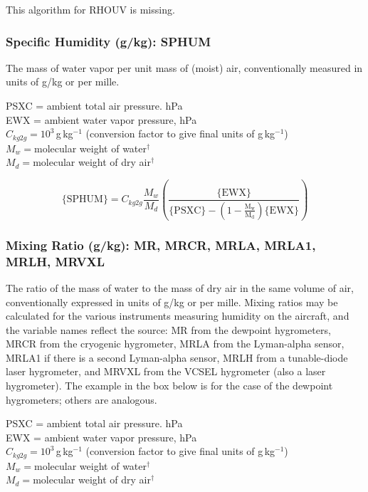 \documentclass[
  english,
]{book}
\begin{document}
This algorithm for RHOUV is missing.

\hypertarget{sphum}{%
\subsubsection*{Specific Humidity (g/kg): SPHUM}\label{sphum}}

The mass of water vapor per unit mass of (moist) air, conventionally measured in units of g/kg or per mille.

PSXC = ambient total air pressure. hPa\\
EWX = ambient water vapor pressure, hPa\\
\(C_{kg2g}=10^{3}\,\)g\(\,\)kg\(^{-1}\) (conversion factor to give
final units of g\(\,\)kg\(^{-1}\))\\
\(M_{w}=\)molecular weight of water\(^{\dagger}\)\\
\(M_{d}=\)molecular weight of dry air\(^{\dagger}\)

\begin{equation}
\mathrm{\{SPHUM\}} = C_{kg2g}\frac{M_{w}}{M_{d}}(\mathrm{\frac{\{EWX\}}{\mathrm{\{PSXC\}-(1-\frac{M_{w}}{M_{d}})\{\mathrm{EWX}\}}}})
\label{eq:SPHUM}
\end{equation}

\hypertarget{MR}{%
\subsubsection*{Mixing Ratio (g/kg): MR, MRCR, MRLA, MRLA1, MRLH, MRVXL}\label{MR}}

The ratio of the mass of water to the mass of dry air in the same volume of air, conventionally expressed in units of g/kg or per mille. Mixing ratios may be calculated for the various instruments measuring humidity on the aircraft, and the variable names reflect the source: MR from the dewpoint hygrometers, MRCR from the cryogenic hygrometer, MRLA from the Lyman-alpha sensor, MRLA1 if there is a second Lyman-alpha sensor, MRLH from a tunable-diode laser hygrometer, and MRVXL from the VCSEL hygrometer (also a laser hygrometer). The example in the box below is for the case of the dewpoint hygrometers; others are analogous.

PSXC = ambient total air pressure. hPa\\
EWX = ambient water vapor pressure, hPa\\
\(C_{kg2g}=10^{3}\,\)g\(\,\)kg\(^{-1}\) (conversion factor to give
final units of g\(\,\)kg\(^{-1}\))\\
\(M_{w}=\)molecular weight of water\(^{\dagger}\)\\
\(M_{d}=\)molecular weight of dry air\(^{\dagger}\)
\end{document}
